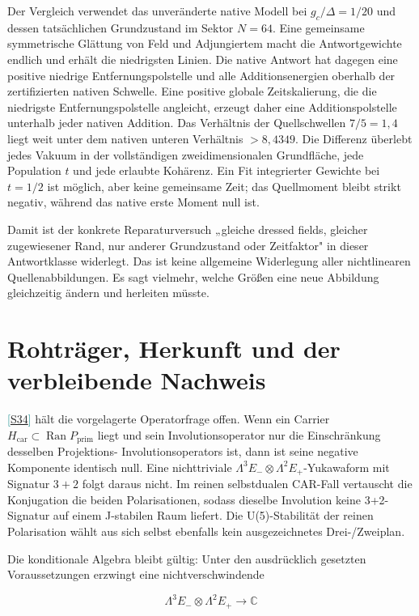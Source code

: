 \documentclass[11pt,a4paper,oneside,parskip=half,headings=normal,numbers=noenddot,bibliography=totoc]{scrreprt}
\newcommand{\src}[1]{\textcolor{teal}{\small[\hyperref[s:#1]{S#1}]}}
\begin{document}
Der Vergleich verwendet das unveränderte native Modell bei $g_c/\Delta=1/20$ und dessen tatsächlichen Grundzustand im Sektor $N=64$. Eine gemeinsame symmetrische Glättung von Feld und Adjungiertem macht die Antwortgewichte endlich und erhält die niedrigsten Linien. Die native Antwort hat dagegen eine positive niedrige Entfernungspolstelle
und alle Additionsenergien oberhalb der zertifizierten nativen Schwelle. Eine
positive globale Zeitskalierung, die die niedrigste Entfernungspolstelle
angleicht, erzeugt daher eine Additionspolstelle unterhalb jeder nativen
Addition. Das Verhältnis der Quellschwellen $7/5=1{,}4$ liegt weit unter
dem nativen unteren Verhältnis $>8{,}4349$. Die Differenz überlebt jedes
Vakuum in der vollständigen zweidimensionalen Grundfläche, jede Population
\(t\) und jede erlaubte Kohärenz. Ein Fit integrierter Gewichte bei \(t=1/2\)
ist möglich, aber keine gemeinsame Zeit; das Quellmoment bleibt strikt
negativ, während das native erste Moment null ist.

Damit ist der konkrete Reparaturversuch „gleiche dressed fields, gleicher
zugewiesener Rand, nur anderer Grundzustand oder Zeitfaktor" in dieser
Antwortklasse widerlegt. Das ist keine allgemeine Widerlegung aller
nichtlinearen Quellenabbildungen. Es sagt vielmehr, welche Größen eine neue
Abbildung gleichzeitig ändern und herleiten müsste.

\section{Rohträger, Herkunft und der verbleibende Nachweis}

\src{34} hält die vorgelagerte Operatorfrage offen. Wenn
ein Carrier \(H_\mathrm{car}\subset\operatorname{Ran}P_\mathrm{prim}\) liegt und
sein Involutionsoperator nur die Einschränkung desselben Projektions-
Involutionsoperators ist, dann ist seine negative Komponente identisch null.
Eine nichttriviale \(\Lambda^3E_-\otimes\Lambda^2E_+\)-Yukawaform mit
Signatur $3+2$ folgt daraus nicht. Im reinen selbstdualen CAR-Fall vertauscht
die Konjugation die beiden Polarisationen, sodass dieselbe Involution keine
3+2-Signatur auf einem J-stabilen Raum liefert. Die U(5)-Stabilität der
reinen Polarisation wählt aus sich selbst ebenfalls kein ausgezeichnetes
Drei-/Zweiplan.

Die konditionale Algebra bleibt gültig: Unter den ausdrücklich gesetzten
Voraussetzungen erzwingt eine nichtverschwindende

\[
 \Lambda^3E_-\otimes\Lambda^2E_+\to\mathbb C
\]
\end{document}
